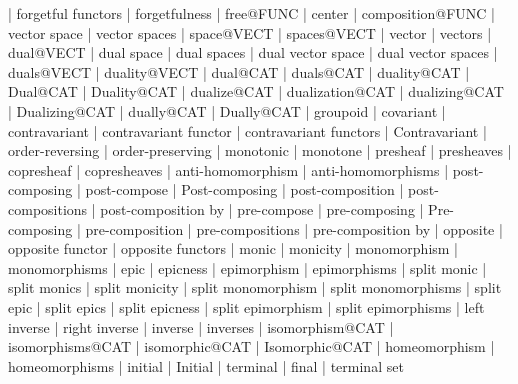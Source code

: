     |   forgetful functors
    |   forgetfulness
    |   free@FUNC
    |   center
    |   composition@FUNC
    |   vector space
    |   vector spaces
    |   space@VECT
    |   spaces@VECT
    |   vector
    |   vectors
    |   dual@VECT
    |   dual space
    |   dual spaces
    |   dual vector space
    |   dual vector spaces
    |   duals@VECT
    |   duality@VECT
    |   dual@CAT
    |   duals@CAT
    |   duality@CAT
    |   Dual@CAT
    |   Duality@CAT
    |   dualize@CAT
    |   dualization@CAT
    |   dualizing@CAT
    |   Dualizing@CAT
    |   dually@CAT
    |   Dually@CAT
    |   groupoid
    |   covariant
    |   contravariant
    |   contravariant functor
    |   contravariant functors
    |   Contravariant
    |   order-reversing
    |   order-preserving
    |   monotonic
    |   monotone
    |   presheaf
    |   presheaves
    |   copresheaf
    |   copresheaves
    |   anti-homomorphism
    |   anti-homomorphisms
    |   post-composing
    |   post-compose
    |   Post-composing
    |   post-composition
    |   post-compositions
    |   post-composition by
    |   pre-compose
    |   pre-composing
    |   Pre-composing
    |   pre-composition
    |   pre-compositions
    |   pre-composition by
    |   opposite
    |   opposite functor
    |   opposite functors
    |   monic
    |   monicity
    |   monomorphism
    |   monomorphisms
    |   epic
    |   epicness
    |   epimorphism
    |   epimorphisms
    |   split monic
    |   split monics
    |   split monicity
    |   split monomorphism
    |   split monomorphisms
    |   split epic
    |   split epics
    |   split epicness
    |   split epimorphism
    |   split epimorphisms
    |   left inverse
    |   right inverse
    |   inverse
    |   inverses
    |   isomorphism@CAT
    |   isomorphisms@CAT
    |   isomorphic@CAT
    |   Isomorphic@CAT
    |   homeomorphism
    |   homeomorphisms
    |   initial
    |   Initial
    |   terminal
    |   final
    |   terminal set
